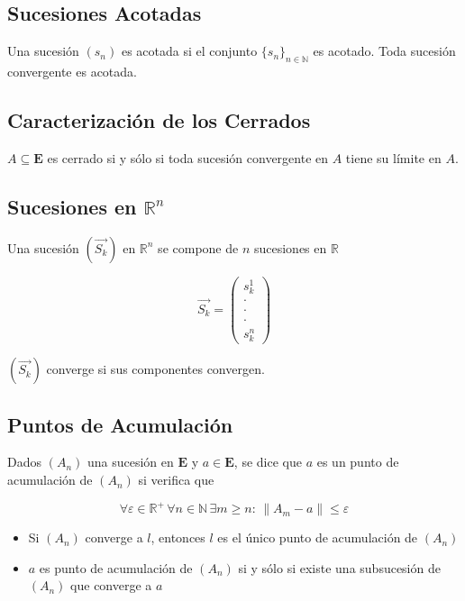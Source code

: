 \subsection{Sucesiones Acotadas}

Una sucesión $(s_n)$ es acotada si el conjunto $\{s_n\}_{n\in\mathbb{N}}$ es acotado. Toda sucesión convergente es acotada.

\subsection{Caracterización de los Cerrados}

$A\subseteq\mathbf{E}$ es cerrado si y sólo si toda sucesión convergente en $A$ tiene su límite en $A$.

\subsection{Sucesiones en $\mathbb{R}^n$}

Una sucesión $(\Vec{S_k})$ en $\mathbb{R}^n$ se compone de $n$ sucesiones en $\mathbb{R}$

\[\Vec{S_k}=\begin{pmatrix} s_k^1\\ \cdot\\ \cdot\\
\cdot\\ s_k^n\end{pmatrix}\]

$(\Vec{S_k})$ converge si sus componentes convergen.

\subsection{Puntos de Acumulación}

Dados $(A_n)$ una sucesión en $\mathbf{E}$ y $a\in\mathbf{E}$, se dice que $a$ es un punto de acumulación de $(A_n)$ si verifica que

\[\forall\varepsilon\in\mathbb{R}^+\,
\forall n\in\mathbb{N}\, \exists m\geq n:\,
\|A_m-a\|\leq \varepsilon\]

\begin{itemize}
    \item Si $(A_n)$ converge a $l$, entonces $l$ es el único punto de acumulación de $(A_n)$
    \item $a$ es punto de acumulación de $(A_n)$ si y sólo si existe una subsucesión de $(A_n)$ que converge a $a$
\end{itemize}

